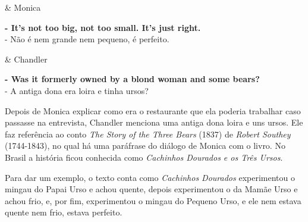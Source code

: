 \begin{tcolorbox}[enhanced,center upper,
    drop fuzzy shadow southeast, boxrule=0.3pt,
    lower separated=false,
    colframe=black!30!dialogoBorder,colback=white]
\begin{minipage}[c]{0.16\linewidth}
   & \centering \scriptsize{Monica}
\end{minipage}
\hfill
\begin{minipage}[c]{0.8\linewidth}
  \textbf{- It's not too big, not too small. It's just right.}\\
  - Não é nem grande nem pequeno, é perfeito.
\end{minipage}

\medskip
\begin{minipage}[c]{0.16\linewidth}
   & \centering \scriptsize{Chandler}
\end{minipage}
\hfill
\begin{minipage}[c]{0.8\linewidth}
  \textbf{- Was it formerly owned by a blond woman and some bears?}\\
  - A antiga dona era loira e tinha ursos?
\end{minipage}
\end{tcolorbox}

Depois de Monica explicar como era o restaurante que ela poderia
trabalhar caso passasse na entrevista, Chandler menciona uma antiga dona
loira e uns ursos. Ele faz referência ao conto \emph{The Story of the
Three Bears} (1837) de \emph{Robert Southey} (1744-1843), no qual há uma
paráfrase do diálogo de Monica com o livro. No Brasil a história ficou
conhecida como \emph{Cachinhos Dourados e os Três Ursos}.

Para dar um exemplo, o texto conta como \emph{Cachinhos Dourados}
experimentou o mingau do Papai Urso e achou quente, depois experimentou
o da Mamãe Urso e achou frio, e, por fim, experimentou o mingau do
Pequeno Urso, e ele nem estava quente nem frio, estava perfeito.

